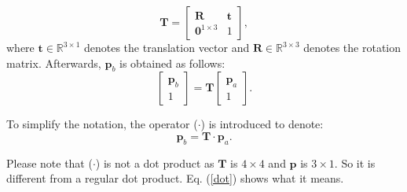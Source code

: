 \begin{equation}
\mathbf{T} = \left[\begin{array}{cc}
\mathbf{R} & \mathbf{t} \\
\mathbf{0}^{1 \times 3} & 1 \label{transform}
\end{array}\right],
\end{equation} 
where $\mathbf{t}\in\mathbb{R}^{3\times1}$ denotes the translation vector and $\mathbf{R}\in \mathbb{R}^{3\times3}$ denotes the rotation matrix. Afterwards, $\mathbf{p}_{b}$ is obtained as follows:
\begin{equation}
\left[\begin{array}{c}
\mathbf{p}_b \\
1
\end{array}\right]=\mathbf{T}\left[\begin{array}{c}
\mathbf{p}_a \\
1
\end{array}\right]. \label{dot}
\end{equation} \par
To simplify the notation, the operator ($\cdot$) is introduced to denote:
\begin{equation}
\mathbf{p}_b=\mathbf{T} \cdot \mathbf{p}_a. 
\end{equation} \par
Please note that ($\cdot$) is not a dot product as $\mathbf{T}$ is $4 \times 4$ and $\mathbf{p}$ is $3\times 1$. So it is different from a regular dot product. Eq. (\ref{dot}) shows what it means.

